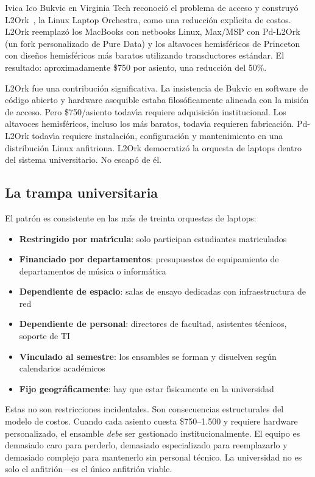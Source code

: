 \documentclass[10pt,letterpaper,twocolumn]{article}
\begin{document}
Ivica Ico Bukvic en Virginia Tech reconoci\'{o} el problema de acceso y construy\'{o} L2Ork~\citep{bukvic2010l2ork}, la Linux Laptop Orchestra, como una reducci\'{o}n expl\'{\i}cita de costos. L2Ork reemplaz\'{o} los MacBooks con netbooks Linux, Max/MSP con Pd-L2Ork (un fork personalizado de Pure Data) y los altavoces hemisf\'{e}ricos de Princeton con dise\~{n}os hemisf\'{e}ricos m\'{a}s baratos utilizando transductores est\'{a}ndar. El resultado: aproximadamente \$750 por asiento, una reducci\'{o}n del 50\%.

L2Ork fue una contribuci\'{o}n significativa. La insistencia de Bukvic en software de c\'{o}digo abierto y hardware asequible estaba filos\'{o}ficamente alineada con la misi\'{o}n de acceso. Pero \$750/asiento todav\'{\i}a requiere adquisici\'{o}n institucional. Los altavoces hemisf\'{e}ricos, incluso los m\'{a}s baratos, todav\'{\i}a requieren fabricaci\'{o}n. Pd-L2Ork todav\'{\i}a requiere instalaci\'{o}n, configuraci\'{o}n y mantenimiento en una distribuci\'{o}n Linux anfitriona. L2Ork democratiz\'{o} la orquesta de laptops dentro del sistema universitario. No escap\'{o} de \'{e}l.

\subsection{La trampa universitaria}

El patr\'{o}n es consistente en las m\'{a}s de treinta orquestas de laptops:

\begin{itemize}
  \item \textbf{Restringido por matr\'{\i}cula}: solo participan estudiantes matriculados
  \item \textbf{Financiado por departamentos}: presupuestos de equipamiento de departamentos de m\'{u}sica o inform\'{a}tica
  \item \textbf{Dependiente de espacio}: salas de ensayo dedicadas con infraestructura de red
  \item \textbf{Dependiente de personal}: directores de facultad, asistentes t\'{e}cnicos, soporte de TI
  \item \textbf{Vinculado al semestre}: los ensambles se forman y disuelven seg\'{u}n calendarios acad\'{e}micos
  \item \textbf{Fijo geogr\'{a}ficamente}: hay que estar f\'{\i}sicamente en la universidad
\end{itemize}

Estas no son restricciones incidentales. Son consecuencias estructurales del modelo de costos. Cuando cada asiento cuesta \$750--1.500 y requiere hardware personalizado, el ensamble \emph{debe} ser gestionado institucionalmente. El equipo es demasiado caro para perderlo, demasiado especializado para reemplazarlo y demasiado complejo para mantenerlo sin personal t\'{e}cnico. La universidad no es solo el anfitri\'{o}n---es el \'{u}nico anfitri\'{o}n viable.
\end{document}
